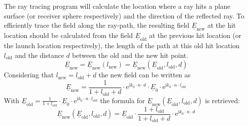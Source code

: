 The ray tracing program will calculate the location where a ray hits a plane surface (or receiver sphere respectively) and the direction of the reflected ray.
To efficiently trace the field along the ray-path, the resulting field \(\underline{E}_{\text{new}}\) at the hit location should be calculated from the field \(\underline{E}_{\text{old}}\) at the previous hit location (or the launch location respectively), the length of the path at this old hit location \(l_{\text{old}}\) and the distance \(d\) between the old and the new hit point.
\begin{equation}
    \underline{E}_{\text{new}} = \underline{E}_{\text{new}}(l_{\text{new}}) = \underline{E}_{\text{new}}(\underline{E}_{\text{old}}, l_{\text{old}}, d)
\end{equation}
Considering that \(l_{\text{new}} = l_{\text{old}} + d\) the new field can be written as
\begin{equation}
    \underline{E}_{\text{new}} = \frac{1}{1 + l_{\text{old}} + d} \cdot \mathrm{e}^{\mathrm{i} k_0 \cdot n \cdot d}  \cdot \underline{E}_{0} \cdot \mathrm{e}^{\mathrm{i} k_0 \cdot n \cdot l_{\text{old}}} 
\end{equation}
With \(\underline{E}_{\text{old}} = \frac{1}{1 + l_{\text{old}}} \cdot \underline{E}_0 \cdot \mathrm{e}^{\mathrm{i} k_0 \cdot n \cdot l_{\text{old}}} \) the formula for \(\underline{E}_{\text{new}}(\underline{E}_{\text{old}}, l_{\text{old}}, d)\) is retrieved:
\begin{equation}
    \underline{E}_{\text{new}}(\underline{E}_{\text{old}}, l_{\text{old}}, d) = \underline{E}_{\text{old}} \cdot \frac{1 + l_{\text{old}}}{1 + l_{\text{old}} + d} \cdot \mathrm{e}^{\mathrm{i} k_0 \cdot n \cdot d}
\end{equation}

